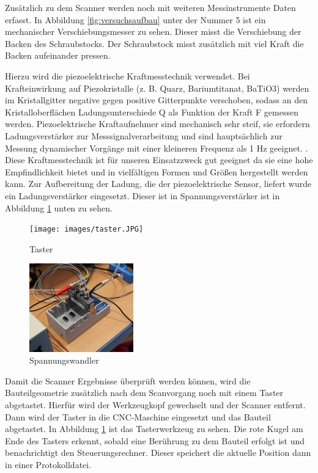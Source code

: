 Zusätzlich zu dem Scanner werden noch mit weiteren Messinstrumente Daten erfasst.
In Abbildung \ref{fig:versuchsaufbau} unter der Nummer 5 ist ein mechanischer 
Verschiebungsmesser zu sehen. Dieser misst die Verschiebung der Backen des 
Schraubstocks. Der Schraubstock misst zusätzlich mit viel Kraft die Backen 
aufeinander pressen.

Hierzu wird die piezoelektrische Kraftmesstechnik verwendet.
Bei Krafteinwirkung auf Piezokristalle (z. B. Quarz, Bariumtitanat, BaTiO3) 
werden im Kristallgitter negative gegen positive Gitterpunkte
verschoben, sodass an den Kristalloberflächen
Ladungsunterschiede Q als Funktion der Kraft F
gemessen werden.
Piezoelektrische Kraftaufnehmer sind mechanisch sehr steif, 
sie erfordern Ladungsverstärker
zur Messsignalverarbeitung und sind hauptsächlich zur Messung dynamischer Vorgänge
mit einer kleineren Frequenz als 1 Hz geeignet. \cite{Czichos.2020}. 
Diese Kraftmesstechnik ist 
für unseren Einsatzzweck gut geeignet da sie eine hohe Empfindlichkeit bietet 
und in vielfältigen Formen und Größen hergestellt werden kann. Zur Aufbereitung 
der Ladung, die der piezoelektrische Sensor, liefert wurde ein Ladungsverstärker 
eingesetzt.\cite{Schwartz.2006}
Dieser ist in Spannungsverstärker ist in Abbildung \ref{fig:taster} unten zu sehen.

\begin{figure}[b]
    \texttt{[image: images/taster.JPG]}
    \caption{Taster}
    \label{fig:taster}
\end{figure}

\begin{figure}[b]
    \includegraphics[width=0.4\textwidth]{images/piezoelektrische.JPG}
    \caption{Spannungswandler}
    \label{fig:piez}
\end{figure}

Damit die Scanner Ergebnisse überprüft werden können,
wird die Bauteilgeometrie zusätzlich nach dem Scanvorgang noch mit einem Taster
abgetastet. Hierfür wird der Werkzeugkopf gewechselt und der Scanner entfernt.
Dann wird der Taster in die CNC-Maschine eingesetzt und das Bauteil abgetastet.
In Abbildung \ref{fig:taster} ist das Tasterwerkzeug zu sehen. Die rote Kugel 
am Ende des Tasters erkennt, sobald eine Berührung zu dem Bauteil erfolgt ist 
und benachrichtigt den Steuerungsrechner. Dieser speichert die aktuelle Position 
dann in einer Protokolldatei.

